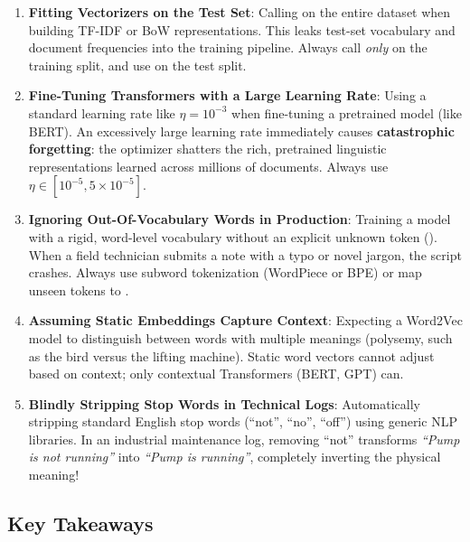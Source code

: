 \begin{warning}
\begin{enumerate}
    \item \textbf{Fitting Vectorizers on the Test Set}: Calling  on the entire dataset when building TF-IDF or BoW representations. This leaks test-set vocabulary and document frequencies into the training pipeline. Always call  \emph{only} on the training split, and use  on the test split.
    \item \textbf{Fine-Tuning Transformers with a Large Learning Rate}: Using a standard learning rate like $\eta = 10^{-3}$ when fine-tuning a pretrained model (like BERT). An excessively large learning rate immediately causes \textbf{catastrophic forgetting}: the optimizer shatters the rich, pretrained linguistic representations learned across millions of documents. Always use $\eta \in [10^{-5}, 5 \times 10^{-5}]$.
    \item \textbf{Ignoring Out-Of-Vocabulary Words in Production}: Training a model with a rigid, word-level vocabulary without an explicit unknown token (\code{[UNK]}). When a field technician submits a note with a typo or novel jargon, the script crashes. Always use subword tokenization (WordPiece or BPE) or map unseen tokens to \code{[UNK]}.
    \item \textbf{Assuming Static Embeddings Capture Context}: Expecting a Word2Vec model to distinguish between words with multiple meanings (polysemy, such as  the bird versus  the lifting machine). Static word vectors cannot adjust based on context; only contextual Transformers (BERT, GPT) can.
    \item \textbf{Blindly Stripping Stop Words in Technical Logs}: Automatically stripping standard English stop words (``not'', ``no'', ``off'') using generic NLP libraries. In an industrial maintenance log, removing ``not'' transforms \emph{``Pump is not running''} into \emph{``Pump is running''}, completely inverting the physical meaning!
\end{enumerate}
\end{warning}

\subsection{Key Takeaways}\label{subsec:takeaways}

